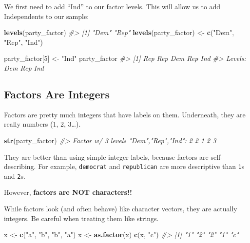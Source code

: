\documentclass[
]{book}
\newenvironment{Shaded}{\begin{snugshade}}{\end{snugshade}}
\newcommand{\CommentTok}[1]{\textcolor[rgb]{0.56,0.35,0.01}{\textit{#1}}}
\newcommand{\DecValTok}[1]{\textcolor[rgb]{0.00,0.00,0.81}{#1}}
\newcommand{\KeywordTok}[1]{\textcolor[rgb]{0.13,0.29,0.53}{\textbf{#1}}}
\newcommand{\NormalTok}[1]{#1}
\newcommand{\StringTok}[1]{\textcolor[rgb]{0.31,0.60,0.02}{#1}}
\begin{document}
We first need to add ``Ind'' to our factor levels. This will allow us to add Independents to our sample:

\begin{Shaded}
\begin{Highlighting}[]
\KeywordTok{levels}\NormalTok{(party_factor)}
\CommentTok{#> [1] "Dem" "Rep"}
\KeywordTok{levels}\NormalTok{(party_factor) <-}\StringTok{ }\KeywordTok{c}\NormalTok{(}\StringTok{"Dem"}\NormalTok{, }\StringTok{"Rep"}\NormalTok{, }\StringTok{"Ind"}\NormalTok{)}

\NormalTok{party_factor[}\DecValTok{5}\NormalTok{] <-}\StringTok{ "Ind"}
\NormalTok{party_factor}
\CommentTok{#> [1] Rep Rep Dem Rep Ind}
\CommentTok{#> Levels: Dem Rep Ind}
\end{Highlighting}
\end{Shaded}

\hypertarget{factors-are-integers}{%
\subsection{Factors Are Integers}\label{factors-are-integers}}

Factors are pretty much integers that have labels on them. Underneath, they are really numbers (1, 2, 3\ldots).

\begin{Shaded}
\begin{Highlighting}[]
\KeywordTok{str}\NormalTok{(party_factor)}
\CommentTok{#>  Factor w/ 3 levels "Dem","Rep","Ind": 2 2 1 2 3}
\end{Highlighting}
\end{Shaded}

They are better than using simple integer labels, because factors are self-describing. For example, \texttt{democrat} and \texttt{republican} are more descriptive than \texttt{1}s and \texttt{2}s.

However, \textbf{factors are NOT characters!!}

While factors look (and often behave) like character vectors, they are actually integers. Be careful when treating them like strings.

\begin{Shaded}
\begin{Highlighting}[]
\NormalTok{x <-}\StringTok{ }\KeywordTok{c}\NormalTok{(}\StringTok{"a"}\NormalTok{, }\StringTok{"b"}\NormalTok{, }\StringTok{"b"}\NormalTok{, }\StringTok{"a"}\NormalTok{)}
\NormalTok{x <-}\StringTok{ }\KeywordTok{as.factor}\NormalTok{(x)}
\KeywordTok{c}\NormalTok{(x, }\StringTok{"c"}\NormalTok{)}
\CommentTok{#> [1] "1" "2" "2" "1" "c"}
\end{Highlighting}
\end{Shaded}
\end{document}
